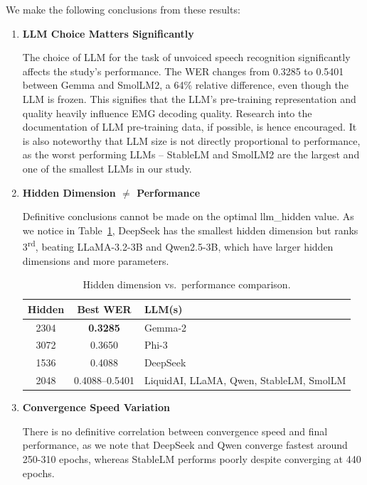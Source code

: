 We make the following conclusions from these results:

\begin{enumerate}
    \item \textbf{LLM Choice Matters Significantly}

The choice of LLM for the task of unvoiced speech recognition significantly affects the study's performance. The WER changes from 0.3285 to 0.5401 between Gemma and SmolLM2, a 64\% relative difference, even though the LLM is frozen. This signifies that the LLM's pre-training representation and quality heavily influence EMG decoding quality. Research into the documentation of LLM pre-training data, if possible, is hence encouraged. It is also noteworthy that LLM size is not directly proportional to performance, as the worst performing LLMs -- StableLM and SmolLM2 are the largest and one of the smallest LLMs in our study.

    \item \textbf{Hidden Dimension $\neq$ Performance}

Definitive conclusions cannot be made on the optimal llm\_hidden value. As we notice in Table~\ref{tab:hidden_dim}, DeepSeek has the smallest hidden dimension but ranks 3\textsuperscript{rd}, beating LLaMA-3.2-3B and Qwen2.5-3B, which have larger hidden dimensions and more parameters.

\begin{table}[ht]
\centering
\caption{Hidden dimension vs.\ performance comparison.}
\label{tab:hidden_dim}
\begin{tabular}{ccl}
\toprule
\textbf{Hidden} & \textbf{Best WER} & \textbf{LLM(s)} \\
\midrule
\rowcolor{gray!12} 2304 & \textbf{0.3285} & Gemma-2 \\
3072 & 0.3650 & Phi-3 \\
\rowcolor{gray!12} 1536 & 0.4088 & DeepSeek \\
2048 & 0.4088--0.5401 & LiquidAI, LLaMA, Qwen, StableLM, SmolLM \\
\bottomrule
\end{tabular}
\end{table}

    \item \textbf{Convergence Speed Variation}

There is no definitive correlation between convergence speed and final performance, as we note that DeepSeek and Qwen converge fastest around 250-310 epochs, whereas StableLM performs poorly despite converging at 440 epochs.
\end{enumerate}


